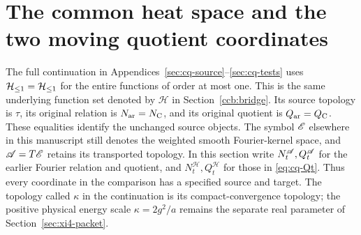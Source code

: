 \section{The common heat space and the two moving quotient coordinates}
\label{ccb:continuation}
The full continuation in Appendices~\ref{sec:cq-source}--\ref{sec:cq-tests}
uses $\mathcal H_{\leq 1}=\mathcal H_{\leq1}$ for the entire functions of order at
most one. This is the same underlying function set denoted by
$\mathcal H$ in Section~\ref{ccb:bridge}. Its source topology is
$\tau$, its original relation is $N_{\rm ar}=N_{\rm C}$, and its
original quotient is $Q_{\rm ar}=Q_{\rm C}$. These equalities identify
the unchanged source objects. The symbol $\mathscr E$ elsewhere in this
manuscript still denotes the weighted smooth Fourier-kernel space,
and $\mathscr A=T\mathscr E$ retains its transported topology. In this section write
$N_t^{\mathscr A},Q_t^{\mathscr A}$ for the earlier Fourier relation and quotient,
and $N_t^{\mathcal H},Q_t^{\mathcal H}$ for those in
\eqref{eq:cq-Qt}. Thus every coordinate in the comparison has a
specified source and target. The topology called $\kappa$ in the
continuation is its compact-convergence topology; the positive
physical energy scale $\kappa=2g^2/a$ remains the separate real
parameter of Section~\ref{sec:xi4-packet}.

